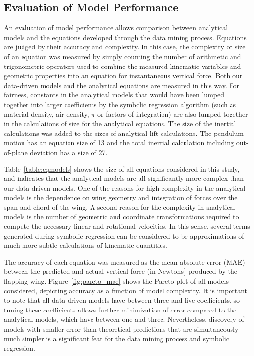 \documentclass{article}
\begin{document}
\subsection*{Evaluation of Model Performance}
An evaluation of model performance allows comparison between analytical models and the equations developed through the data mining process.  Equations are judged by their accuracy and complexity.  In this case, the complexity or size of an equation was measured by simply counting the number of arithmetic and trigonometric operators used to combine the measured kinematic variables and geometric properties into an equation for instantaneous vertical force.  Both our data-driven models and the analytical equations are measured in this way.  For fairness, constants in the analytical models that would have been lumped together into larger coefficients by the symbolic regression algorithm (such as material density, air density, \(\pi\) or factors of integration) are also lumped together in the calculations of size for the analytical equations.  The size of the inertial calculations was added to the sizes of analytical lift calculations.  The 
pendulum motion has an equation size of 13 and the total inertial calculation including out-of-plane deviation has a size of 27.

Table~\ref{table:eqmodels} shows the size of all equations considered in this study, and indicates that the analytical models are all significantly more complex than our data-driven models.  One of the reasons for high complexity in the analytical models is the dependence on wing geometry and integration of forces over the span and chord of the wing.  A second reason for the complexity in analytical models is the number of geometric and coordinate transformations required to compute the necessary linear and rotational velocities.  In this sense, several terms generated during symbolic regression can be considered to be approximations of much more subtle calculations of kinematic quantities.

The accuracy of each equation was measured as the mean absolute error (MAE) between the predicted and actual vertical force (in Newtons) produced by the flapping wing.  Figure~\ref{fig:pareto_mae} shows the Pareto plot of all models considered, depicting accuracy as a function of model complexity. It is important to note that all data-driven models have between three and five coefficients, so tuning these coefficients allows further minimization of error compared to the analytical models, which have between one and three.  Nevertheless, discovery of models with smaller error than theoretical predictions that are simultaneously much simpler is a significant feat for the data mining process and symbolic regression.
\end{document}
